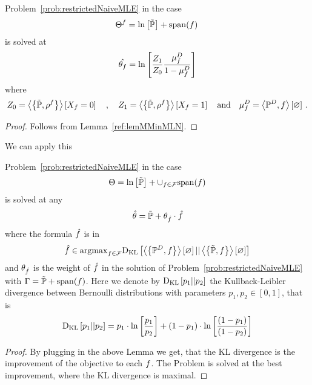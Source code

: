 \begin{lemma}
	Problem~\ref{prob:restrictedNaiveMLE}  in the case
	\begin{align*}
		\Theta^{f} = \ln \left[ \tilde{\mathbb{P}} \right] + \mathrm{span}(f) \,  
	\end{align*}
	is solved at
	\begin{align*}
		\hat{\theta_{f}} = \ln \left[  \frac{Z_1}{Z_0} \frac{\mu^{D}_{f} }{1-\mu^{D}_{f} }  \right] 
	\end{align*}
	where
	\begin{align*}
		Z_0 = \left\langle \left\{\tilde{\mathbb{P}}, \rho^{f}\right\}\right\rangle \left[ X_{f}=0 \right]  \quad , \quad
		Z_1 = \left\langle \left\{\tilde{\mathbb{P}}, \rho^{f}\right\}\right\rangle \left[ X_{f}=1 \right]  \quad \text{and} \quad
		\mu^{D}_{f} = \left\langle \mathbb{P}^{D}, f\right\rangle \left[ \varnothing \right] \, .
	\end{align*}
\end{lemma}
\begin{proof}
	Follows from Lemma~\ref{ref:lemMMinMLN}.
\end{proof}

We can apply this 

\begin{lemma}
	Problem~\ref{prob:restrictedNaiveMLE} in the case 
	\begin{align*}
		\Theta = \ln \left[ \tilde{\mathbb{P}} \right] + \cup_{f\in\mathcal{F}} \mathrm{span}(f) 
	\end{align*}
	is solved at any
	\begin{align*}
		\hat{\theta} = \tilde{\mathbb{P}} + \theta_{\hat{f}} \cdot \hat{f}
	\end{align*}
	where the formula $\hat{f}$ is in
	\begin{align*}
		\hat{f} \in \mathrm{argmax}_{f\in\mathcal{F}} \mathrm{D}_{\mathrm{KL}}\left[ \left\langle \left\{\mathbb{P}^{D},f\right\}\right\rangle \left[ \varnothing \right] || \left\langle \left\{\tilde{\mathbb{P}},f\right\}\right\rangle \left[ \varnothing \right] \right]
	\end{align*}
	and $\theta_{\hat{f}}$ is the weight of $\hat{f}$ in the solution of Problem~\ref{prob:restrictedNaiveMLE} with $\Gamma = \tilde{\mathbb{P}} + \mathrm{span}(f)$.
	Here we denote by $\mathrm{D}_{\mathrm{KL}}\left[ p_1 || p_2 \right]$ the Kullback-Leibler divergence between Bernoulli distributions with parameters $p_1,p_2\in[0,1]$, that is
		\[ \mathrm{D}_{\mathrm{KL}}\left[ p_1 || p_2 \right] = p_1 \cdot \ln \left[ \frac{p_1}{p_2} \right] + (1-p_1) \cdot \ln \left[ \frac{(1-p_1)}{(1-p_2)} \right]  \]
\end{lemma}	
\begin{proof}
	By plugging in the above Lemma we get, that the KL divergence is the improvement of the objective to each $f$.
	The Problem is solved at the best improvement, where the KL divergence is maximal.
\end{proof}

